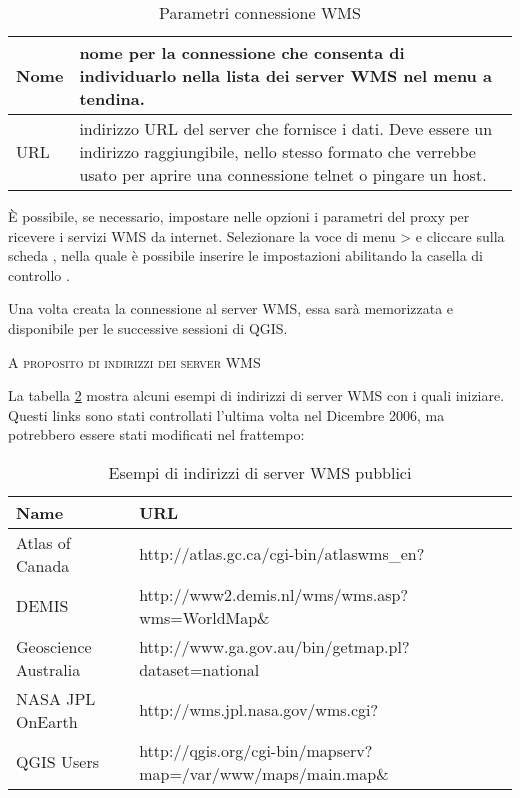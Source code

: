 \begin{table}[ht]
\centering
\caption{Parametri connessione WMS}\label{tab:wms_connection_parms}\medskip
 \begin{tabular}{|l|p{5in}|}
\hline Nome & nome per la connessione che consenta di individuarlo nella
lista dei server WMS nel menu a tendina. \\
\hline URL \index{WMS!URL} &  indirizzo URL del server che fornisce i dati.
Deve essere un indirizzo raggiungibile, nello stesso formato che verrebbe
usato per aprire una connessione telnet o pingare un host. \\
\hline
\end{tabular}
\end{table}

È possibile, se necessario, impostare nelle opzioni i parametri del proxy per ricevere i servizi WMS da internet.
Selezionare la voce di menu  >
 e cliccare sulla scheda
, nella quale è possibile inserire le impostazioni abilitando la
casella di controllo .

Una volta creata la connessione al server WMS, essa sarà memorizzata e
disponibile per le successive sessioni di QGIS.

\begin{Tip}[ht]\caption{\textsc{A proposito di indirizzi dei server WMS}}
\end{Tip}

La tabella \ref{tab:wms_example_urls} mostra alcuni esempi di indirizzi di
server WMS con i quali iniziare.
Questi links sono stati controllati l'ultima volta nel Dicembre 2006, ma
potrebbero essere stati modificati nel frattempo:


\begin{table}[ht]
\centering
\caption{Esempi di indirizzi di server WMS pubblici}\label{tab:wms_example_urls}\medskip
 \begin{tabular}{|l|l|}
\hline \textbf{Name}        & \textbf{URL} \\
\hline Atlas of Canada      & http://atlas.gc.ca/cgi-bin/atlaswms\_en? \\
\hline DEMIS                & http://www2.demis.nl/wms/wms.asp?wms=WorldMap\& \\
\hline Geoscience Australia & http://www.ga.gov.au/bin/getmap.pl?dataset=national \\
\hline NASA JPL OnEarth     & http://wms.jpl.nasa.gov/wms.cgi? \\
\hline QGIS Users           & http://qgis.org/cgi-bin/mapserv?map=/var/www/maps/main.map\& \\
\hline
\end{tabular}
\end{table}

